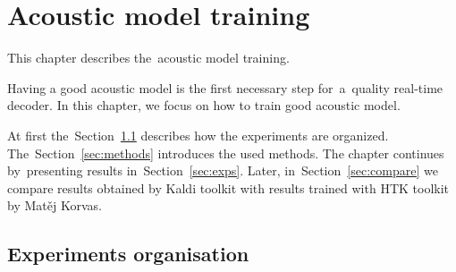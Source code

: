 \chapter{Acoustic model training}
\label{cha:training}

This chapter describes the~acoustic model training.

Having a good acoustic model is the first necessary step for~a~quality real-time decoder.
In this chapter, we focus on how to train good acoustic model.

At first the~Section~\ref{sec:setup} describes how the experiments are organized.  
The~Section~\ref{sec:methods} introduces the used methods. 
The chapter continues by~presenting results in~Section~\ref{sec:exps}. 
Later, in~Section~\ref{sec:compare} we compare results obtained by Kaldi toolkit with results
trained with \ac{HTK} toolkit by Matěj Korvas.

\section{Experiments organisation} 
\label{sec:setup}

